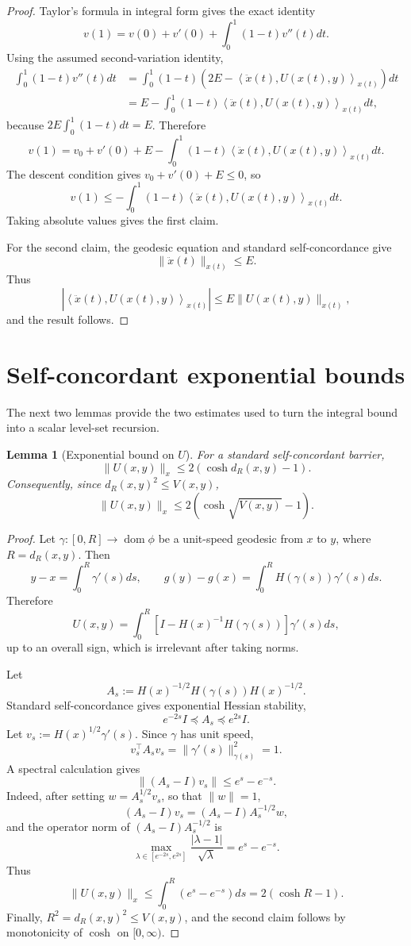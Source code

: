 \documentclass[11pt]{article}
\newtheorem{lemma}{Lemma}
\newcommand{\ip}[2]{\left\langle #1,#2\right\rangle}
\begin{document}
\begin{proof}
Taylor's formula in integral form gives the exact identity
\[
    v(1)=v(0)+v'(0)+\int_0^1(1-t)v''(t)dt.
\]
Using the assumed second-variation identity,
\[
\begin{aligned}
    \int_0^1(1-t)v''(t)dt
    &=
    \int_0^1(1-t)\left(2E-\ip{\ddot x(t)}{U(x(t),y)}_{x(t)}\right)dt \\
    &=
    E-
    \int_0^1(1-t)\ip{\ddot x(t)}{U(x(t),y)}_{x(t)}dt,
\end{aligned}
\]
because $2E\int_0^1(1-t)dt=E$. Therefore
\[
    v(1)
    =
    v_0+v'(0)+E
    -
    \int_0^1(1-t)\ip{\ddot x(t)}{U(x(t),y)}_{x(t)}dt.
\]
The descent condition gives $v_0+v'(0)+E\le0$, so
\[
    v(1)
    \le
    -\int_0^1(1-t)\ip{\ddot x(t)}{U(x(t),y)}_{x(t)}dt.
\]
Taking absolute values gives the first claim.

For the second claim, the geodesic equation and standard self-concordance give
\[
    \|\ddot x(t)\|_{x(t)}\le E.
\]
Thus
\[
    \left|\ip{\ddot x(t)}{U(x(t),y)}_{x(t)}\right|
    \le
    E\|U(x(t),y)\|_{x(t)},
\]
and the result follows.
\end{proof}

\section{Self-concordant exponential bounds}

The next two lemmas provide the two estimates used to turn the integral bound into a scalar level-set recursion.

\begin{lemma}[Exponential bound on $U$]
For a standard self-concordant barrier,
\[
    \|U(x,y)\|_x
    \le
    2\left(\cosh d_R(x,y)-1\right).
\]
Consequently, since $d_R(x,y)^2\le V(x,y)$,
\[
    \|U(x,y)\|_x
    \le
    2\left(\cosh\sqrt{V(x,y)}-1\right).
\]
\end{lemma}

\begin{proof}
Let $\gamma:[0,R]\to\operatorname{dom}\phi$ be a unit-speed geodesic from $x$ to $y$, where $R=d_R(x,y)$. Then
\[
    y-x=\int_0^R \gamma'(s)ds,
    \qquad
    g(y)-g(x)=\int_0^R H(\gamma(s))\gamma'(s)ds.
\]
Therefore
\[
    U(x,y)
    =
    \int_0^R
    \left[I-H(x)^{-1}H(\gamma(s))\right]\gamma'(s)ds,
\]
up to an overall sign, which is irrelevant after taking norms.

Let
\[
    A_s:=H(x)^{-1/2}H(\gamma(s))H(x)^{-1/2}.
\]
Standard self-concordance gives exponential Hessian stability,
\[
    e^{-2s}I\preceq A_s\preceq e^{2s}I.
\]
Let $v_s:=H(x)^{1/2}\gamma'(s)$. Since $\gamma$ has unit speed,
\[
    v_s^\top A_s v_s=\|\gamma'(s)\|_{\gamma(s)}^2=1.
\]
A spectral calculation gives
\[
    \|(A_s-I)v_s\|
    \le
    e^s-e^{-s}.
\]
Indeed, after setting $w=A_s^{1/2}v_s$, so that $\|w\|=1$,
\[
    (A_s-I)v_s=(A_s-I)A_s^{-1/2}w,
\]
and the operator norm of $(A_s-I)A_s^{-1/2}$ is
\[
    \max_{\lambda\in[e^{-2s},e^{2s}]}
    \frac{|\lambda-1|}{\sqrt\lambda}
    =e^s-e^{-s}.
\]
Thus
\[
    \|U(x,y)\|_x
    \le
    \int_0^R(e^s-e^{-s})ds
    =2(\cosh R-1).
\]
Finally, $R^2=d_R(x,y)^2\le V(x,y)$, and the second claim follows by monotonicity of $\cosh$ on $[0,\infty)$.
\end{proof}
\end{document}
